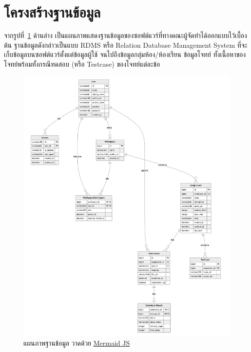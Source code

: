 \documentclass[12pt,one side,openright,a4paper]{cpe-thesis-th}
\newcommand{\thaijustify}[1]{%
  \par\hspace{30pt}\justifying
  #1
}
\begin{document}
\section{โครงสร้างฐานข้อมูล}
\thaijustify{
  จากรูปที่~\ref{fig:database} ด้านล่าง เป็นแผนภาพแสดงฐานข้อมูลของซอฟต์แวร์ที่ทางคณะผู้จัดทำได้ออกแบบไว้เบื้องต้น ฐานข้อมูลดังกล่าวเป็นแบบ RDMS หรือ Relation Database Management System ที่จะเก็บข้อมูลบนซอฟต์แวร์ตั้งแต่ข้อมูลผู้ใช้ จนไปถึงข้อมูลกลุ่มห้อง/ห้องเรียน ข้อมูลโจทย์ ทั้งเนื้อหาของโจทย์พร้อมทั้งกรณีทดสอบ (หรือ Testcase) ของโจทย์แต่ละข้อ
}
\hypertarget{database}{
  \begin{figure}[H]
    \centering
    \includegraphics[width=15cm]{figure/diagram/database-v3.png}
    \caption[แผนภาพฐานข้อมูล]{แผนภาพฐานข้อมูล วาดด้วย \href{https://mermaid.js.org/}{Mermaid JS}}
    \label{fig:database}
  \end{figure}
}
\pagebreak
\end{document}
